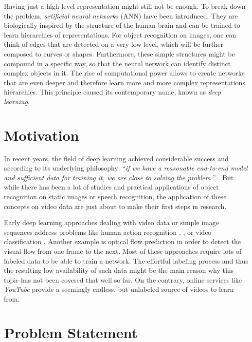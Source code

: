 Having just a high-level representation might still not be enough. To break down the problem, \textit{artificial neural networks} (ANN) have been introduced. They are biologically inspired by the structure of the human brain \parencite{ann} and can be trained to learn hierarchies of representations. For object recognition on images, one can think of edges that are detected on a very low level, which will be further composed to curves or shapes. Furthermore, these simple structures might be compound in a specific way, so that the neural network can identify distinct complex objects in it. The rise of computational power allows to create networks that are even deeper and therefore learn more and more complex representations hierarchies. This principle caused its contemporary name, known as \textit{deep learning}.

\section{Motivation}

In recent years, the field of deep learning achieved considerable success and according to its underlying philosophy: ``\textit{if we have a reasonable end-to-end model and sufficient data for training it, we are close to solving the problem.}'' \parencite{conv_lstm_nowcasting}. But while there has been a lot of studies and practical applications of object recognition on static images or speech recognition, the application of these concepts on video data are just about to make their first steps in research. 

Early deep learning approaches dealing with video data or simple image sequences address problems like human action recognition \parencite{conv3d_action_class}, \parencite{two_stream_action}, \parencite{longterm_rec_recog} or video classification \parencite{large_video_class}. Another example is optical flow prediction \parencite{flownet} in order to detect the visual flow from one frame to the next. Most of these approaches require lots of labeled data to be able to train a network. The effortful labeling process and thus the resulting low availability of such data might be the main reason why this topic has not been covered that well so far. On the contrary, online services like \textit{YouTube} provide a seemingly endless, but unlabeled source of videos to learn from.


\section{Problem Statement}

